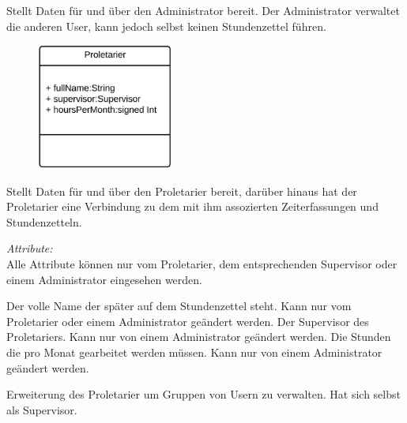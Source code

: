\begin{itemize}
                Stellt Daten für und über den Administrator bereit.
                Der Administrator verwaltet die anderen User, kann jedoch selbst keinen Stundenzettel führen.


                \begin{figure}[htb]
                \centering
                \includegraphics[width=4.5cm]{Diagramms/class/singleclass/Proletarier.pdf}
                \end{figure}
                \newline
                Stellt Daten für und über den Proletarier bereit, darüber hinaus hat der Proletarier eine Verbindung zu dem mit ihm assozierten Zeiterfassungen und Stundenzetteln.

                \emph{Attribute:}\\
                Alle Attribute können nur vom Proletarier, dem entsprechenden Supervisor oder einem Administrator eingesehen werden.
                \begin{itemize}
                        Der volle Name der später auf dem Stundenzettel steht.
                        Kann nur vom Proletarier oder einem Administrator geändert werden.
                        Der Supervisor des Proletariers.
                        Kann nur von einem Administrator geändert werden.
                        Die Stunden die pro Monat gearbeitet werden müssen.
                        Kann nur von einem Administrator geändert werden.
                \end{itemize}

                Erweiterung des Proletarier um Gruppen von Usern zu verwalten.
                Hat sich selbst als Supervisor.
            

\end{itemize}
